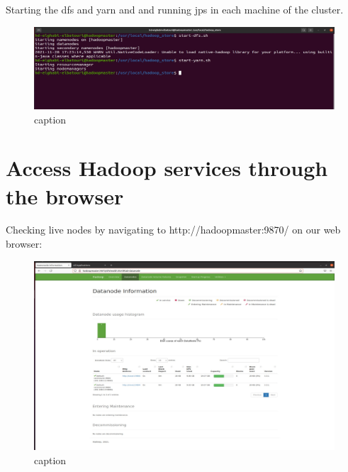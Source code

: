 \begin{spacing}{1.2}
\par Starting the dfs and yarn and and running jps in each machine of the cluster.
\\
\begin{figure}[!htb] 
\begin{center} 
\includegraphics[width=1\linewidth]{Big_Data/Hadoop/Multi-Nodes Cluster/Starting dfs and yarn.jpg} 
\end{center} 
\caption{caption} 
\end{figure} 
\FloatBarrier


\section{Access Hadoop services through the browser}

\par Checking live nodes by navigating to http://hadoopmaster:9870/ on our web browser: 
\\
\begin{figure}[!htb] 
\begin{center} 
\includegraphics[width=1\linewidth]{Big_Data/Hadoop/Multi-Nodes Cluster/Checking live nodes.jpg} 
\end{center} 
\caption{caption} 
\end{figure} 
\FloatBarrier



\end{spacing}
